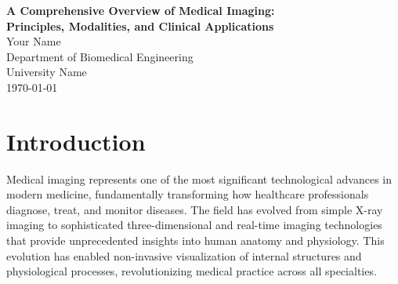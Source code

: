 \documentclass[12pt]{article}
\begin{document}
\begin{titlepage}
\begin{center}
\vspace*{2cm}
{\LARGE\bfseries A Comprehensive Overview of Medical Imaging:\\[0.5cm] 
Principles, Modalities, and Clinical Applications}\\[2cm]

{\large Your Name}\\[1cm]
Department of Biomedical Engineering\\
University Name\\[1cm]

\vfill
{\large \today}
\end{center}
\end{titlepage}

\begin{abstract}
This comprehensive review explores the fundamental principles and clinical applications of modern medical imaging technologies. The article examines the physical foundations of various imaging modalities, including X-ray computed tomography (CT), magnetic resonance imaging (MRI), ultrasound, and nuclear medicine techniques. We discuss how these technologies leverage different forms of energy-matter interactions to visualize internal body structures and physiological processes. The review also analyzes the specific clinical applications of each modality across various medical specialties, highlighting their roles in diagnosis, treatment planning, and disease monitoring. This work provides healthcare professionals and researchers with a thorough understanding of current medical imaging capabilities and their impact on patient care.
\end{abstract}

\newpage
\tableofcontents
\newpage

\section{Introduction}
Medical imaging represents one of the most significant technological advances in modern medicine, fundamentally transforming how healthcare professionals diagnose, treat, and monitor diseases. The field has evolved from simple X-ray imaging to sophisticated three-dimensional and real-time imaging technologies that provide unprecedented insights into human anatomy and physiology. This evolution has enabled non-invasive visualization of internal structures and physiological processes, revolutionizing medical practice across all specialties.
\end{document}

